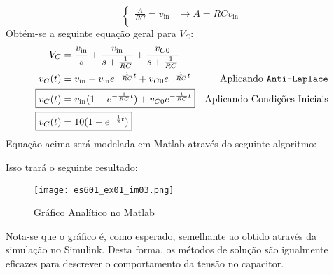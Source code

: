 \documentclass{article}
\begin{document}
\begin{resolution}
\begin{equation*}
\begin{cases}
                            \frac{A}{RC} = v_{\text{in}} & \rightarrow \boxed{A = RCv_{\text{in}}}\\
                        \end{cases}
                    \end{equation*}
                Obtém-se a seguinte equação geral para $V_{C}$:
                    \begin{align}
                        V_{C}       &= \frac{v_{\text{in}}}{s} + \frac{v_{\text{in}}}{s + \frac{1}{RC}} + \frac{v_{C0}}{s + \frac{1}{RC}}\nonumber\\
                        v_{C}(t)    &= v_{\text{in}} - v_{\text{in}}e^{-\frac{1}{RC}t} + v_{C0}e^{-\frac{1}{RC}t} & \text{Aplicando \texttt{Anti-Laplace}}\nonumber\\
                        \Aboxed{
                            v_{C}(t)    &= v_{\text{in}}(1 - e^{-\frac{1}{RC}t}) + v_{C0}e^{-\frac{1}{RC}t}
                        } & \text{Aplicando Condições Iniciais}\\
                        \Aboxed{
                            v_{C}(t)    &= 10(1 - e^{-\frac{1}{2}t})
                        }
                    \end{align}
\newpage
                Equação acima será modelada em Matlab através do seguinte algoritmo:
                    \begin{scriptsize}
                        \myOctave
                        
                    \end{scriptsize}
\newpage
                Isso trará o seguinte resultado:
                    \begin{figure}[H]
                        \centering
                        \texttt{[image: es601\_ex01\_im03.png]}
                        \caption{Gráfico Analítico no Matlab}
                    \end{figure}
                Nota-se que o gráfico é, como esperado, semelhante ao obtido através da simulação no Simulink. Desta forma, os métodos de solução são igualmente eficazes para descrever o comportamento da tensão no capacitor.
            \end{resolution}
\end{document}
